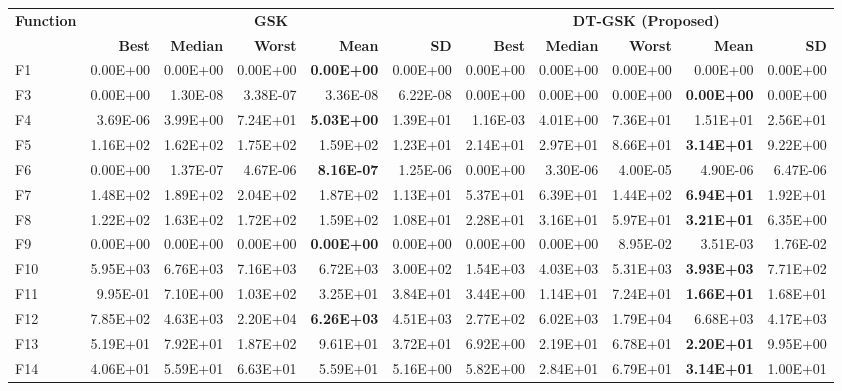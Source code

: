 \zebra
\begin{tabular}{lrrrrrrrrrr}
\toprule
\textbf{Function} & \multicolumn{5}{c}{\textbf{GSK}} & \multicolumn{5}{c}{\textbf{DT-GSK (Proposed)}} \\
\cmidrule(lr){2-6} \cmidrule(lr){7-11}
 & \textbf{Best} & \textbf{Median} & \textbf{Worst} & \textbf{Mean} & \textbf{SD} & \textbf{Best} & \textbf{Median} & \textbf{Worst} & \textbf{Mean} & \textbf{SD} \\
\midrule
F1 & 0.00E+00 & 0.00E+00 & 0.00E+00 & \textbf{0.00E+00} & 0.00E+00 & 0.00E+00 & 0.00E+00 & 0.00E+00 & 0.00E+00 & 0.00E+00 \\
F3 & 0.00E+00 & 1.30E-08 & 3.38E-07 & 3.36E-08 & 6.22E-08 & 0.00E+00 & 0.00E+00 & 0.00E+00 & \textbf{0.00E+00} & 0.00E+00 \\
F4 & 3.69E-06 & 3.99E+00 & 7.24E+01 & \textbf{5.03E+00} & 1.39E+01 & 1.16E-03 & 4.01E+00 & 7.36E+01 & 1.51E+01 & 2.56E+01 \\
F5 & 1.16E+02 & 1.62E+02 & 1.75E+02 & 1.59E+02 & 1.23E+01 & 2.14E+01 & 2.97E+01 & 8.66E+01 & \textbf{3.14E+01} & 9.22E+00 \\
F6 & 0.00E+00 & 1.37E-07 & 4.67E-06 & \textbf{8.16E-07} & 1.25E-06 & 0.00E+00 & 3.30E-06 & 4.00E-05 & 4.90E-06 & 6.47E-06 \\
F7 & 1.48E+02 & 1.89E+02 & 2.04E+02 & 1.87E+02 & 1.13E+01 & 5.37E+01 & 6.39E+01 & 1.44E+02 & \textbf{6.94E+01} & 1.92E+01 \\
F8 & 1.22E+02 & 1.63E+02 & 1.72E+02 & 1.59E+02 & 1.08E+01 & 2.28E+01 & 3.16E+01 & 5.97E+01 & \textbf{3.21E+01} & 6.35E+00 \\
F9 & 0.00E+00 & 0.00E+00 & 0.00E+00 & \textbf{0.00E+00} & 0.00E+00 & 0.00E+00 & 0.00E+00 & 8.95E-02 & 3.51E-03 & 1.76E-02 \\
F10 & 5.95E+03 & 6.76E+03 & 7.16E+03 & 6.72E+03 & 3.00E+02 & 1.54E+03 & 4.03E+03 & 5.31E+03 & \textbf{3.93E+03} & 7.71E+02 \\
F11 & 9.95E-01 & 7.10E+00 & 1.03E+02 & 3.25E+01 & 3.84E+01 & 3.44E+00 & 1.14E+01 & 7.24E+01 & \textbf{1.66E+01} & 1.68E+01 \\
F12 & 7.85E+02 & 4.63E+03 & 2.20E+04 & \textbf{6.26E+03} & 4.51E+03 & 2.77E+02 & 6.02E+03 & 1.79E+04 & 6.68E+03 & 4.17E+03 \\
F13 & 5.19E+01 & 7.92E+01 & 1.87E+02 & 9.61E+01 & 3.72E+01 & 6.92E+00 & 2.19E+01 & 6.78E+01 & \textbf{2.20E+01} & 9.95E+00 \\
F14 & 4.06E+01 & 5.59E+01 & 6.63E+01 & 5.59E+01 & 5.16E+00 & 5.82E+00 & 2.84E+01 & 6.79E+01 & \textbf{3.14E+01} & 1.00E+01 \\

\end{tabular}
